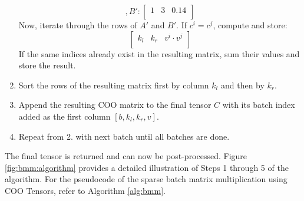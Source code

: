 \begin{enumerate}[label*=\arabic*.]
\begin{equation*}
              , B':
              \begin{bmatrix}
                  1 & 3 & 0.14 \\
              \end{bmatrix}
          \end{equation*}
          Now, iterate through the rows of $A'$ and $B'$. If $c^i = c^j$, compute and store:
          \begin{equation*}
              \begin{bmatrix}
                  k_l & k_r & v^i \cdot v^j \\
              \end{bmatrix}
          \end{equation*}
          If the same indices already exist in the resulting matrix, sum their values and store the result.
    \item Sort the rows of the resulting matrix first by column $k_l$ and then by $k_r$.
    \item Append the resulting COO matrix to the final tensor $C$ with its batch index added as the
          first column $[b, k_l, k_r, v]$.
    \item Repeat from 2. with next batch until all batches are done.
\end{enumerate}
The final tensor is returned and can now be post-processed. Figure \ref{fig:bmm:algorithm} provides
a detailed illustration of Steps 1 through 5 of the algorithm. For the pseudocode of the sparse batch
matrix multiplication using COO Tensors, refer to Algorithm \ref{alg:bmm}.

